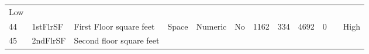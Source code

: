 \documentclass[11pt]{article}
\begin{document}
\begin{longtable}[]{@{}llllllllllll@{}}
\begin{minipage}[t]{0.04\columnwidth}
Low\strut
\end{minipage}\tabularnewline
\begin{minipage}[t]{0.04\columnwidth}\raggedright\strut
44\strut
\end{minipage} & \begin{minipage}[t]{0.04\columnwidth}\raggedright\strut
1stFlrSF\strut
\end{minipage} & \begin{minipage}[t]{0.04\columnwidth}\raggedright\strut
First Floor square feet\strut
\end{minipage} & \begin{minipage}[t]{0.04\columnwidth}\raggedright\strut
Space\strut
\end{minipage} & \begin{minipage}[t]{0.04\columnwidth}\raggedright\strut
Numeric\strut
\end{minipage} & \begin{minipage}[t]{0.04\columnwidth}\raggedright\strut
No\strut
\end{minipage} & \begin{minipage}[t]{0.04\columnwidth}\raggedright\strut
1162\strut
\end{minipage} & \begin{minipage}[t]{0.04\columnwidth}\raggedright\strut
334\strut
\end{minipage} & \begin{minipage}[t]{0.04\columnwidth}\raggedright\strut
4692\strut
\end{minipage} & \begin{minipage}[t]{0.04\columnwidth}\raggedright\strut
0\strut
\end{minipage} & \begin{minipage}[t]{0.04\columnwidth}\raggedright\strut
\strut
\end{minipage} & \begin{minipage}[t]{0.04\columnwidth}\raggedright\strut
High\strut
\end{minipage}\tabularnewline
\begin{minipage}[t]{0.04\columnwidth}\raggedright\strut
45\strut
\end{minipage} & \begin{minipage}[t]{0.04\columnwidth}\raggedright\strut
2ndFlrSF\strut
\end{minipage} & \begin{minipage}[t]{0.04\columnwidth}\raggedright\strut
Second floor square feet\strut
\end{minipage} & \begin{minipage}[t]{0.04\columnwidth}\raggedright\strut

\end{minipage}
\end{longtable}
\end{document}
